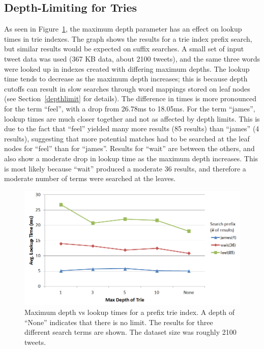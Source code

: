 \documentclass{vldb}
\begin{document}
\subsection{Depth-Limiting for Tries}
As seen in Figure~\ref{comptrie}, the maximum depth parameter has an effect on lookup times in trie indexes. The graph shows the results for a trie index prefix search, but similar results would be expected on suffix searches. A small set of input tweet data was used (367 KB data, about 2100 tweets), and the same three words were looked up in indexes created with differing maximum depths. The lookup time tends to decrease as the maximum depth increases; this is because depth cutoffs can result in slow searches through word mappings stored on leaf nodes (see Section~\ref{depthlimit} for details). The difference in times is more pronounced for the term ``feel'', with a drop from 26.78ms to 18.05ms. For the term ``james'', lookup times are much closer together and not as affected by depth limits. This is due to the fact that ``feel'' yielded many more results (85 results) than ``james'' (4 results), suggesting that more potential matches had to be searched at the leaf nodes for ``feel'' than for ``james''. Results for ``wait'' are between the others, and also show a moderate drop in lookup time as the maximum depth increases. This is most likely because ``wait'' produced a moderate 36 results, and therefore a moderate number of terms were searched at the leaves.

\begin{figure}[h!]
   \includegraphics[scale=.43]{trie_maxdepth_graph}
  \caption{Maximum depth vs lookup times for a prefix trie index. A depth of ``None'' indicates that there is no limit. The results for three different search terms are shown. The dataset size was roughly 2100 tweets.}
\label{comptrie}
\end{figure}
\end{document}
